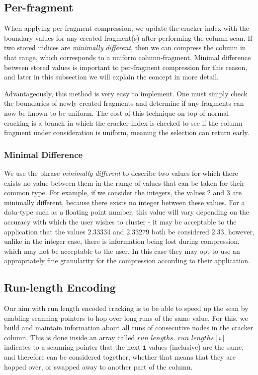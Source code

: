 \subsection{Per-fragment}

\label{ss:perfrag}

When applying per-fragment compression, we update the cracker index with the boundary values for any created fragment(s) after performing the column scan. If two stored indices are \textit{minimally different}, then we can compress the column in that range, which corresponds to a uniform column-fragment. Minimal difference between stored values is important to per-fragment compression for this reason, and later in this subsection we will explain the concept in more detail.

Advantageously, this method is very easy to implement. One must simply check the boundaries of newly created fragments and determine if any fragments can now be known to be uniform. The cost of this technique on top of normal cracking is a branch in which the cracker index is checked to see if the column fragment under consideration is uniform, meaning the selection can return early.

\subsubsection{Minimal Difference}

We use the phrase \textit{minimally different} to describe two values for which there exists no value between them in the range of values that can be taken for their common type. For example, if we consider the integers, the values 2 and 3 are minimally different, because there exists no integer between these values. For a data-type such as a floating point number, this value will vary depending on the accuracy with which the user wishes to cluster - it may be acceptable to the application that the values 2.33334 and 2.33279 both be considered 2.33, however, unlike in the integer case, there is information being lost during compression, which may not be acceptable to the user. In this case they may opt to use an appropriately fine granularity for the compression according to their application.

\subsection{Run-length Encoding}

Our aim with run length encoded cracking is to be able to speed up the scan by enabling scanning pointers to hop over long runs of the same value. For this, we build and maintain information about all runs of consecutive nodes in the cracker column. This is done inside an array called $run\_lengths$. $run\_lengths[i]$ indicates to a scanning pointer that the next \texttt{i} values (inclusive) are the same, and therefore can be considered together, whether that means that they are hopped over, or swapped away to another part of the column.

